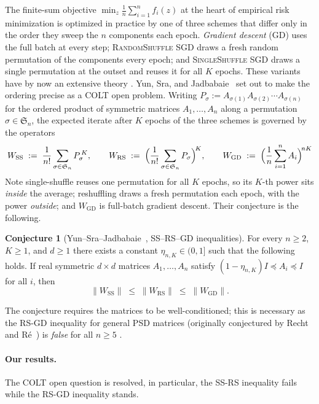 \documentclass[11pt]{article}
\theoremstyle{definition}
\newtheorem{conjecture}[theorem]{Conjecture}
\theoremstyle{remark}
\newcommand{\Sn}{\mathfrak{S}_n}
\newcommand{\norm}[1]{\left\lVert #1 \right\rVert}
\newcommand{\Wss}{W_{\mathrm{SS}}}
\newcommand{\Wrs}{W_{\mathrm{RS}}}
\newcommand{\Wgd}{W_{\mathrm{GD}}}
\newcommand{\psdle}{\preceq}
\begin{document}
The finite-sum objective $\min_z\frac1n\sum_{i=1}^n f_i(z)$ at the heart of empirical risk
minimization is optimized in practice by one of three schemes that differ only in the order they sweep
the $n$ components each epoch. \emph{Gradient descent} (GD) uses the full batch at every step;
\textsc{RandomShuffle} SGD draws a fresh random permutation of the components every epoch; and
\textsc{SingleShuffle} SGD draws a single permutation at the outset and reuses it for all $K$ epochs.
These variants have by now an extensive theory
\cite{HaochenSra19,Nagaraj19,Rajput20,Ahn20,Mishchenko20,SafranShamir20}. Yun, Sra, and
Jadbabaie~\cite{YSJ21open} set out to make the ordering precise as a COLT open problem.  Writing
$P_\sigma:=A_{\sigma(1)}A_{\sigma(2)}\cdots A_{\sigma(n)}$ for the ordered product of symmetric matrices
$A_1,\dots,A_n$ along a permutation $\sigma\in\Sn$, the expected iterate after $K$ epochs of the three
schemes is governed by the operators
\begin{equation}\label{eq:W}
\Wss \;:=\; \frac1{n!}\sum_{\sigma\in\Sn} P_\sigma^{\,K},
\qquad
\Wrs \;:=\; \Bigl(\frac1{n!}\sum_{\sigma\in\Sn} P_\sigma\Bigr)^{\!K},
\qquad
\Wgd \;:=\; \Bigl(\frac1n\sum_{i=1}^n A_i\Bigr)^{\!nK}
\end{equation}
Note single-shuffle reuses one permutation for all $K$ epochs, so its $K$-th power sits \emph{inside} the
average; reshuffling draws a fresh permutation each epoch, with the power \emph{outside}; and $\Wgd$ is
full-batch gradient descent. Their conjecture is the following.

\begin{conjecture}[Yun--Sra--Jadbabaie~\cite{YSJ21open}, SS--RS--GD
inequalities]\label{conj:main}
For every $n\ge2$, $K\ge1$, and $d\ge1$ there exists a constant $\eta_{n,K}\in(0,1]$ such that the
following holds. If real symmetric $d\times d$ matrices $A_1,\dots,A_n$ satisfy
$(1-\eta_{n,K})I\psdle A_i\psdle I$ for all $i$, then
\begin{equation}\label{eq:chain}
\norm{\Wss}\;\le\;\norm{\Wrs}\;\le\;\norm{\Wgd}.
\end{equation}
\end{conjecture}
The conjecture requires the matrices to be well-conditioned; this is necessary as the RS-GD inequality for general PSD matrices (originally conjectured by Recht and R\'e~\cite{RechtRe12}) is \emph{false} for all $n\ge5$ \cite{LaiLim20,DeSa20}.





\paragraph{Our results.} The COLT open question is resolved, in particular, the SS-RS inequality fails while the RS-GD inequality stands.
\end{document}
